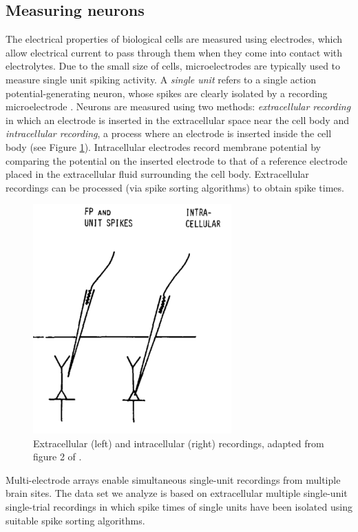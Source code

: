 \subsection{Measuring neurons}
The electrical properties of biological cells are measured using electrodes, which allow electrical current to pass through them when they come into contact with electrolytes. Due to the small size of cells, microelectrodes are typically used to measure single unit spiking activity.
A \textit{single unit} refers to a single action potential-generating neuron, whose spikes are clearly isolated by a recording microelectrode \cite{Humphrey1990}.
Neurons are measured using two methods: \textit{extracellular recording} in which an electrode is inserted in the extracellular space near the cell body and  \textit{intracellular recording}, a process where an electrode is inserted inside the cell body (see Figure \ref{fig:Electrodes}).
Intracellular electrodes record membrane potential by comparing the potential on the inserted electrode to that of a reference electrode placed in the extracellular fluid surrounding the cell body. Extracellular recordings can be 
processed (via spike sorting algorithms) to obtain spike times.

\begin{figure}[h]
\centering
\includegraphics[width=3in]{./images/MeasuringNeuron.png}
\caption{Extracellular (left) and intracellular (right)  recordings, adapted from figure 2 of \cite{Humphrey1990}.}
      \label{fig:Electrodes}
\end{figure}

Multi-electrode arrays enable simultaneous single-unit recordings from multiple brain sites. The data set we analyze is based on extracellular multiple single-unit single-trial recordings in which spike times of single units have been isolated using suitable spike sorting algorithms.


